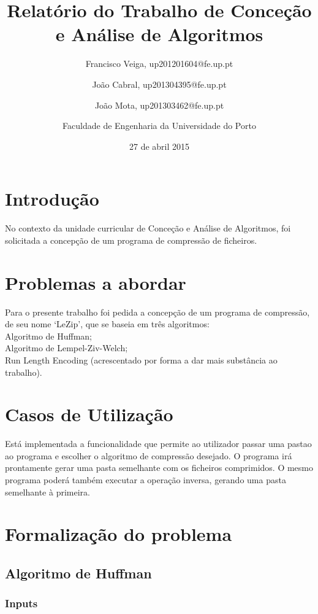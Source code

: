 \documentclass[a4paper,12pt,titlepage]{article}
\begin{document}
\title{Relatório do Trabalho de Conceção e Análise de Algoritmos}
\date{27 de abril 2015}
\author{Francisco Veiga, up201201604@fe.up.pt
 \and João Cabral, up201304395@fe.up.pt
 \and  João Mota, up201303462@fe.up.pt\linebreak
 \and Faculdade de Engenharia da Universidade do Porto}
%
\maketitle
\tableofcontents
\newpage
\section{Introdução}

No contexto da unidade curricular de Conceção e Análise de Algoritmos, foi solicitada a concepção de um programa de compressão de ficheiros.

\section{Problemas a abordar} 
Para o presente trabalho foi pedida a concepção de um programa de compressão, de seu nome `LeZip', que se baseia em três algoritmos:\\Algoritmo de Huffman;\\Algoritmo de Lempel-Ziv-Welch;\\Run Length Encoding (acrescentado por forma a dar mais substância ao trabalho).


\section{Casos de Utilização}
Está implementada a funcionalidade que permite ao utilizador passar uma pastao ao programa e escolher o algoritmo de compressão desejado. O programa irá prontamente gerar uma pasta semelhante com os ficheiros comprimidos. O mesmo programa poderá também executar a operação inversa, gerando uma pasta semelhante à primeira.

\newpage
\section{Formalização do problema}

\subsection{Algoritmo de Huffman}
\subsubsection*{Inputs}
\end{document}
